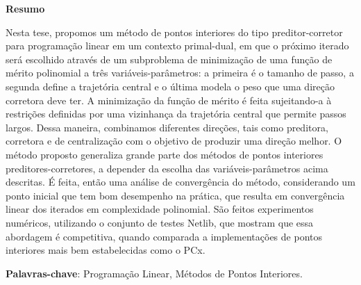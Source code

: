 \begin{center}
  \large{\textbf{Resumo}}
\end{center}

Nesta tese, propomos um método de pontos interiores do tipo preditor-corretor para programação linear em um contexto primal-dual, em que o próximo iterado será escolhido através de um subproblema de minimização de uma função de mérito polinomial a três variáveis-parâmetros: a primeira  é o tamanho de passo, a segunda define a trajetória central e o última modela o peso que uma direção corretora deve ter. A minimização da função de mérito é feita   sujeitando-a à restrições  definidas por uma vizinhança da trajetória central que permite passos largos. Dessa maneira, combinamos diferentes direções, tais como preditora, corretora e de centralização com o objetivo de produzir uma direção melhor. O método proposto generaliza grande parte dos métodos de pontos interiores preditores-corretores, a depender da escolha das variáveis-parâmetros acima descritas. É feita, então uma análise de convergência do método, considerando um ponto inicial que tem bom desempenho na prática, que resulta em convergência linear dos iterados em complexidade polinomial. São feitos experimentos numéricos, utilizando o conjunto de testes Netlib, que mostram que essa abordagem é competitiva, quando comparada a implementações de pontos interiores mais bem estabelecidas como o PCx.




\vspace{.2cm}
\textbf{Palavras-chave}:
Programação Linear, Métodos de Pontos Interiores.
